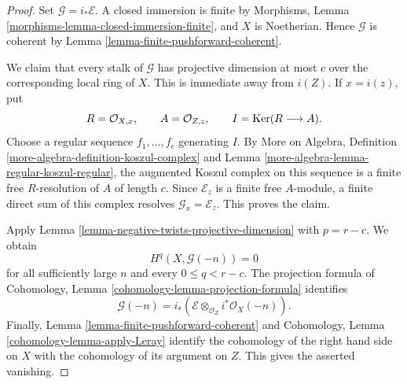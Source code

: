 \begin{proof}
Set $\mathcal{G}=i_*\mathcal{E}$. A closed immersion is finite by
Morphisms, Lemma \ref{morphisms-lemma-closed-immersion-finite}, and $X$ is
Noetherian. Hence $\mathcal{G}$ is coherent by Lemma
\ref{lemma-finite-pushforward-coherent}.

We claim that every stalk of $\mathcal{G}$ has projective dimension at
most $c$ over the corresponding local ring of $X$. This is immediate away
from $i(Z)$. If $x=i(z)$, put
$$
R=\mathcal{O}_{X,x},\qquad A=\mathcal{O}_{Z,z},\qquad
I=\mathop{\mathrm{Ker}}(R\longrightarrow A).
$$
Choose a regular sequence $f_1,\ldots,f_c$ generating $I$. By More on
Algebra, Definition \ref{more-algebra-definition-koszul-complex} and
Lemma \ref{more-algebra-lemma-regular-koszul-regular}, the augmented
Koszul complex on this sequence is a finite free $R$-resolution of $A$ of
length $c$. Since $\mathcal{E}_z$ is a finite free $A$-module, a finite
direct sum of this complex resolves
$\mathcal{G}_x=\mathcal{E}_z$. This proves the claim.

Apply Lemma \ref{lemma-negative-twists-projective-dimension} with
$p=r-c$. We obtain
$$
H^q(X,\mathcal{G}(-n))=0
$$
for all sufficiently large $n$ and every $0\leq q<r-c$.
The projection formula of Cohomology, Lemma
\ref{cohomology-lemma-projection-formula} identifies
$$
\mathcal{G}(-n)=
i_*\left(\mathcal{E}\otimes_{\mathcal{O}_Z}i^*\mathcal{O}_X(-n)\right).
$$
Finally, Lemma \ref{lemma-finite-pushforward-coherent} and Cohomology,
Lemma \ref{cohomology-lemma-apply-Leray} identify the cohomology of the
right hand side on $X$ with the cohomology of its argument on $Z$.
This gives the asserted vanishing.
\end{proof}

